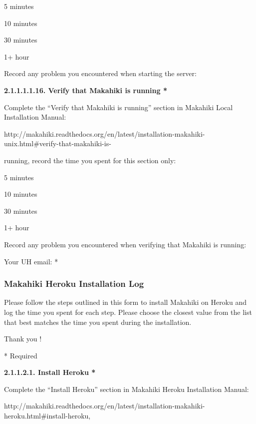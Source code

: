 \begin{radiobutton}
\item 5 minutes
\item  10 minutes
\item  30 minutes
\item  1+ hour
\end{radiobutton}

Record any problem you encountered when starting the server: \underline{\hspace{4cm}}

{\bf 2.1.1.1.1.16. Verify that Makahiki is running *}

Complete the ``Verify that Makahiki is running'' section in Makahiki Local Installation Manual:

http://makahiki.readthedocs.org/en/latest/installation-makahiki-unix.html\#verify-that-makahiki-is-

running,  record the time you spent for this section only:

\begin{radiobutton}
\item 5 minutes
\item  10 minutes
\item  30 minutes
\item  1+ hour
\end{radiobutton}

Record any problem you encountered when verifying that Makahiki is running: \underline{\hspace{3cm}}

Your UH email: * \underline{\hspace{4cm}}

\subsubsection{Makahiki Heroku Installation Log}

Please follow the steps outlined in this form to install Makahiki on Heroku and log the time you spent for each step.
Please choose the closest value from the list that best matches the time you spent during the installation.

Thank you !

* Required

{\bf 2.1.1.2.1. Install Heroku *}

Complete the ``Install Heroku'' section in Makahiki Heroku Installation Manual:

http://makahiki.readthedocs.org/en/latest/installation-makahiki-heroku.html\#install-heroku, 

